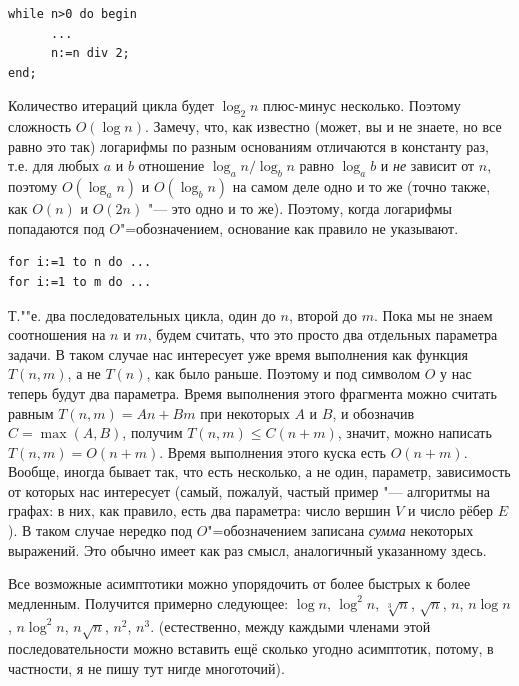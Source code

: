 \documentclass[a4paper,10pt]{problems}
\begin{document}
\begin{codesampleo}\begin{verbatim}
while n>0 do begin
      ...
      n:=n div 2;
end;
\end{verbatim}\end{codesampleo}
Количество итераций цикла будет $\log_2 n$ плюс-минус несколько. 
Поэтому сложность $O(\log n)$. Замечу, что, как известно (может, вы и не 
знаете, но все равно это так) логарифмы по разным основаниям отличаются в 
константу раз, т.е. для любых $a$ и $b$ отношение $\log_a n/\log_b n$ равно 
$\log_a b$ и \textit{не} зависит от $n$, поэтому $O(\log_a n)$ и $O(\log_b n)$ 
на самом деле одно и то же (точно также, как $O(n)$ и $O(2n)$ "--- это одно и 
то же). Поэтому, когда логарифмы попадаются под $O$"=обозначением, основание 
как правило не указывают.

\begin{codesampleo}\begin{verbatim}
for i:=1 to n do ...
for i:=1 to m do ...
\end{verbatim}\end{codesampleo}
Т.""е. два последовательных цикла, один до $n$, второй до $m$. Пока мы не знаем 
соотношения на $n$ и $m$, будем считать, что это просто два отдельных параметра 
задачи. В таком случае нас интересует уже время выполнения как функция 
$T(n,m)$, а не $T(n)$, как было раньше. Поэтому и под символом $O$ у нас теперь 
будут два параметра. Время выполнения этого фрагмента можно считать равным 
$T(n,m)=An+Bm$ при некоторых $A$ и $B$, и обозначив $C=\max(A,B)$, получим 
$T(n,m)\leq C(n+m)$, значит, можно написать $T(n,m)=O(n+m)$. Время выполнения 
этого куска есть $O(n+m)$. Вообще, иногда бывает так, что есть несколько, а не один, 
параметр, зависимость от которых нас интересует (самый, пожалуй, частый пример 
"--- алгоритмы на графах: в них, как правило, есть два параметра: число вершин 
$V$ и число рёбер $E$). В таком случае нередко под $O$"=обозначением записана 
\textit{сумма} некоторых выражений. Это обычно имеет как раз смысл, аналогичный 
указанному здесь.


 Все возможные асимптотики можно 
упорядочить от более быстрых к более медленным. Получится примерно следующее:
$\log n$, $\log^2 n$, $\sqrt[3]{n}$, $\sqrt{n}$, $n$, $n\log n$, 
$n\log^2n$, $n\sqrt n$, $n^2$, $n^3$. (естественно, между каждыми членами этой 
последовательности можно вставить ещё сколько угодно асимптотик, потому, в 
частности, я не пишу тут нигде многоточий).
\end{document}
